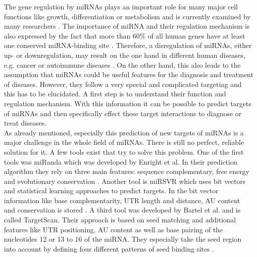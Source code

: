 \documentclass[12pt]{article}
\begin{document}
The gene regulation by miRNAs plays an important role for many major cell functions like growth, differentiation or metabolism and is currently examined by many researchers \cite{Ardekani}. The importance of miRNA and their regulation mechanism is also expressed by the fact that more than 60\% of all human genes have at least one conserved miRNA-binding site \cite{Friedman}. Therefore, a disregulation of miRNAs, either up- or downregulation, may result on the one hand in different human diseases, e.g. cancer or autoimmune diseases \cite{Ardekani}. On the other hand, this also leads to the assumption that miRNAs could be useful features for the diagnosis and treatment of diseases. However, they follow a very special and complicated targeting and this has to be elucidated. A first step is to understand their function and regulation mechanism. With this information it can be possible to predict targets of miRNAs and then specifically effect these target interactions to diagnose or treat diseases. \\
As already mentioned, especially this prediction of new targets of miRNAs is a major challenge in the whole field of miRNAs. There is still no perfect, reliable solution for it. A few tools exist that try to solve this problem. One of the first tools was miRanda which was developed by Enright et al. In their prediction algorithm they rely on three main features: sequence complementary, free energy and evolutionary conservation \cite{Enright}. Another tool is miRSVR which uses bit vectors and statistical learning approaches to predict targets. In the bit vector information like base complementarity, UTR length and distance, AU content and conservation is stored \cite{Betel}. A third tool was developed by Bartel et al. and is called TargetScan. Their approach is based on seed matching and additional features like UTR positioning, AU content as well as base pairing of the nucleotides 12 or 13 to 16 of the miRNA. They especially take the seed region into account by defining four different patterns of seed binding sites \cite{Lewis}.\\\\
\end{document}
